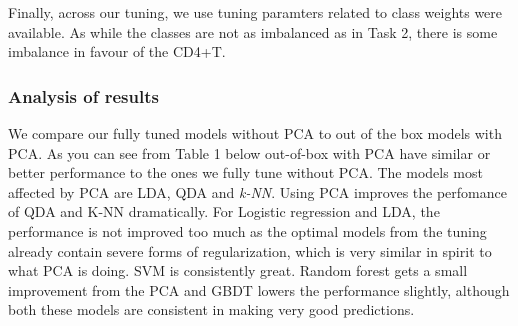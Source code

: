 \documentclass{article}
\begin{document}
Finally, across our tuning, we  use tuning paramters related to class weights were available. As while the classes are not as imbalanced as in Task 2, there is some imbalance in favour of the CD4+T.
    


\subsubsection{Analysis of results}

We compare our fully tuned models without PCA to out of the box models with PCA. As you can see from Table 1 below
out-of-box with PCA have similar or better performance to the ones we fully tune without PCA.
The models most affected by PCA are LDA, QDA and \textit{k-NN}. Using PCA improves the perfomance of QDA and K-NN dramatically. 
For Logistic regression and LDA, the performance is not improved too much as the optimal models from the tuning already contain severe forms of regularization,
which is very similar in spirit to what PCA is doing. SVM is consistently great. Random forest gets a small improvement from the PCA and GBDT lowers the performance slightly,
although both these models are consistent in making very good predictions.
\end{document}
